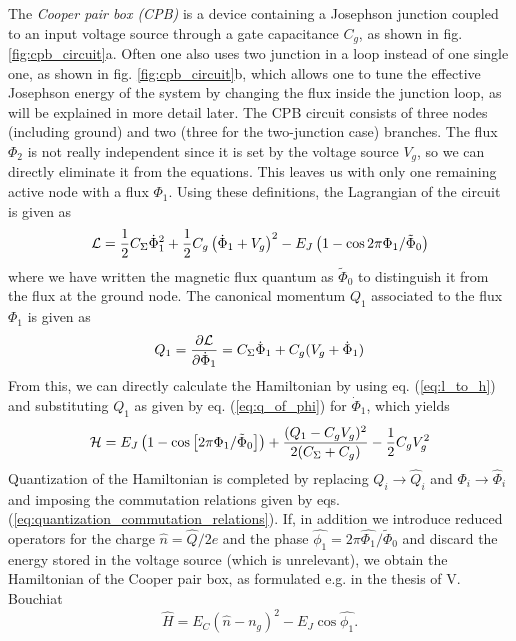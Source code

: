 The {\it Cooper pair box (CPB)} is a device containing a Josephson junction coupled to an input voltage source through a gate capacitance $C_g$, as shown in fig. \ref{fig:cpb_circuit}a. Often one also uses two junction in a loop instead of one single one, as shown in fig. \ref{fig:cpb_circuit}b, which allows one to tune the effective Josephson energy of the system by changing the flux inside the junction loop, as will be explained in more detail later. The CPB circuit consists of  three nodes (including ground) and two (three for the two-junction case) branches. The flux $\Phi_2$ is not really independent since it is set by the voltage source $V_g$, so we can directly eliminate it from the equations. This leaves us with only one remaining active node with a flux $\Phi_1$. Using these definitions, the Lagrangian of the circuit is given as
%
\begin{equation}
\begin{mathcal}L\end{mathcal}=\frac{1}{2}C_\Sigma\dot{\Phi}_1^2+\frac{1}{2}C_g\left(\dot{\Phi}_1+V_g\right)^2-E_J\left(1-\cos{2\pi\Phi_1/\tilde{\Phi}_0}\right)
\end{equation}
%
where we have written the magnetic flux quantum as $\tilde{\Phi}_0$ to distinguish it from the flux at the ground node. The canonical momentum $Q_1$ associated to the flux $\Phi_1$ is given as
%
\begin{equation}
Q_1 = \frac{\partial \begin{mathcal}L\end{mathcal}}{\partial \dot{\Phi}_1} = C_\Sigma \dot{\Phi}_1+C_g(V_g+\dot{\Phi}_1) \label{eq:q_of_phi}
\end{equation}
%
From this, we can directly calculate the Hamiltonian by using eq. (\ref{eq:l_to_h}) and substituting $Q_1$ as given by eq. (\ref{eq:q_of_phi}) for $\dot{\Phi}_1$, which yields
%
\begin{equation}
\begin{mathcal}H\end{mathcal} = E_J\left(1-\cos{\left[2\pi\Phi_1/\tilde{\Phi}_0\right]}\right)+\frac{(Q_1-C_g V_g)^2}{2(C_\Sigma+C_g)}-\frac{1}{2}C_g V_g^2
\end{equation}
%
Quantization of the Hamiltonian is completed by replacing $Q_i\to \hat{Q}_i$ and $\Phi_i\to\hat{\Phi}_i$ and imposing the commutation relations given by eqs. (\ref{eq:quantization_commutation_relations}). If, in addition we introduce reduced operators for the charge $\hat{n}=\hat{Q}/2e$ and the phase $\hat{\phi_1}=2\pi\hat{\Phi_1}/\tilde{\Phi}_0$ and discard the energy stored in the voltage source (which is unrelevant), we obtain the Hamiltonian of the Cooper pair box, as formulated e.g. in the thesis of V. Bouchiat \citep{bouchiat_quantum_1998}
%
\begin{equation}
\hat{H} = E_C \left( \hat{n} - n_g\right)^2-E_J \cos{\hat{\phi_1}}. \label{eq:cpb_hamiltonian}
\end{equation}
%

